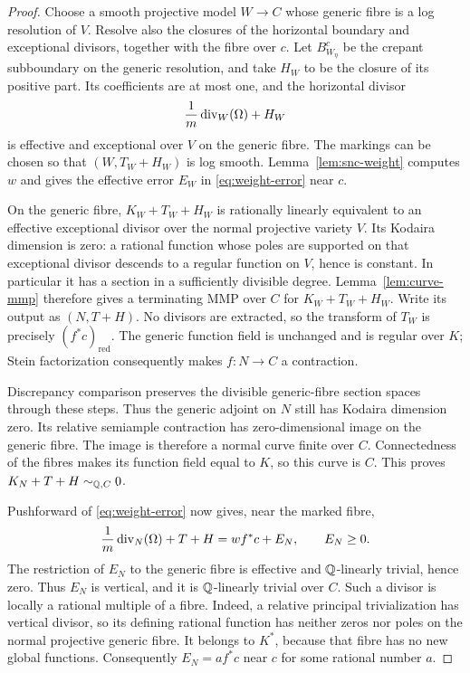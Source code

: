 \begin{proof}
Choose a smooth projective model $W\to C$ whose generic fibre is a
log resolution of $V$.  Resolve also the closures of the horizontal
boundary and exceptional divisors, together with the fibre over $c$.
Let $B^c_{W_\eta}$ be the crepant subboundary on the generic resolution,
and take $H_W$ to be the closure of its positive part.  Its coefficients
are at most one, and the horizontal divisor
\[
       \frac1m\operatorname{div}_W(\Omega)+H_W
\]
is effective and exceptional over $V$ on the generic fibre.  The
markings can be chosen so that $(W,T_W+H_W)$ is log smooth.
Lemma~\ref{lem:snc-weight} computes $w$ and gives the effective error
$E_W$ in \eqref{eq:weight-error} near $c$.

On the generic fibre, $K_W+T_W+H_W$ is rationally linearly equivalent
to an effective exceptional divisor over the normal projective variety
$V$.  Its Kodaira dimension is zero: a rational function whose poles
are supported on that exceptional divisor descends to a regular
function on $V$, hence is constant.  In particular it has a section
in a sufficiently divisible degree.  Lemma~\ref{lem:curve-mmp}
therefore gives a terminating MMP over $C$ for $K_W+T_W+H_W$.
Write its output as $(N,T+H)$.  No divisors are extracted, so the
transform of $T_W$ is precisely $(f^*c)_{\mathrm{red}}$.
The generic function field is unchanged and is regular over $K$;
Stein factorization consequently makes $f:N\to C$ a contraction.

Discrepancy comparison preserves the divisible generic-fibre section
spaces through these steps.  Thus the generic adjoint on $N$ still
has Kodaira dimension zero.  Its relative semiample contraction has
zero-dimensional image on the generic fibre.  The image is therefore
a normal curve finite over $C$.  Connectedness of the fibres makes
its function field equal to $K$, so this curve is $C$.  This proves
$K_N+T+H\sim_{\mathbb Q,C}0$.

Pushforward of \eqref{eq:weight-error} now gives, near the marked fibre,
\begin{equation}\label{eq:prepared-error}
             \frac1m\operatorname{div}_N(\Omega)+T+H=w f^*c+E_N,
             \qquad E_N\ge0.
\end{equation}
The restriction of $E_N$ to the generic fibre is effective and
$\mathbb Q$-linearly trivial, hence zero.  Thus $E_N$ is vertical, and it
is $\mathbb Q$-linearly trivial over $C$.  Such a divisor is locally a
rational multiple of a fibre.  Indeed, a relative principal
trivialization has vertical divisor, so its defining rational function
has neither zeros nor poles on the normal projective generic fibre.
It belongs to $K^*$, because that fibre has no new global functions.
Consequently $E_N=a f^*c$ near $c$ for some rational number $a$.


\end{proof}
